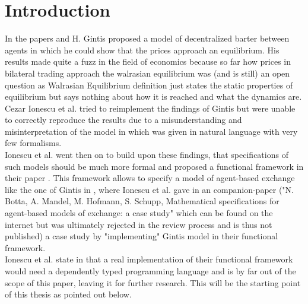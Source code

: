 \documentclass{article}
\begin{document}

\section{Introduction}
In the papers \cite{Gintis2006} and \cite{gintis_dynamics_2007} H. Gintis proposed a model of decentralized barter between agents in which he could show that the prices approach an equilibrium. His results made quite a fuzz in the field of economics because so far how prices in bilateral trading approach the walrasian equilibrium was (and is still) an open question as Walrasian Equilibrium definition just states the static properties of equilibrium but says nothing about how it is reached and what the dynamics are. \\
Cezar Ionescu et al. tried to reimplement the findings of Gintis but were unable to correctly reproduce the results due to a misunderstanding and misinterpretation of the model in \cite{Gintis2006} which was given in natural language with very few formalisms. \\
Ionescu et al. went then on to build upon these findings, that specifications of such models should be much more formal and proposed a functional framework in their paper \cite{Botta20114025}. This framework allows to specify a model of agent-based exchange like the one of Gintis in \cite{Gintis2006}, where Ionescu et al. gave in an companion-paper ("N. Botta, A. Mandel, M. Hofmann, S. Schupp, Mathematical specifications for agent-based models of exchange: a case study" which can be found on the internet but was ultimately rejected in the review process and is thus not published) a case study by "implementing" Gintis model in their functional framework. \\
Ionescu et al. state in \cite{Botta20114025} that a real implementation of their functional framework would need a dependently typed programming language and is by far out of the scope of this paper, leaving it for further research. This will be the starting point of this thesis as pointed out below.\\
\end{document}

